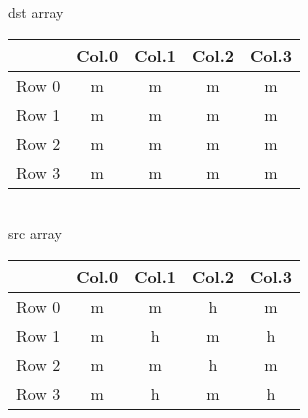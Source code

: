 \documentclass{article}
\begin{document}
\centering
dst array \\
\begin{tabular}{c c c c c}
	\hline
	& Col.0 & Col.1 & Col.2 & Col.3 \\
	\hline
	Row 0 & m & m & m & m \\
	Row 1 & m & m & m & m \\
	Row 2 & m & m & m & m \\
	Row 3 & m & m & m & m \\
\end{tabular} \\
src array \\
\begin{tabular}{c c c c c}
\hline
& Col.0 & Col.1 & Col.2 & Col.3 \\
\hline
Row 0 & m & m & h & m \\
Row 1 & m & h & m & h \\
Row 2 & m & m & h & m \\
Row 3 & m & h & m & h \\
\end{tabular}
\end{document}

